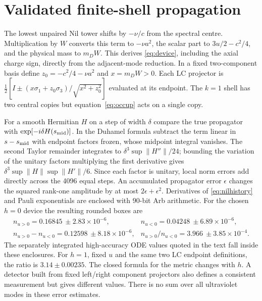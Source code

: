 \section{Validated finite-shell propagation}\label{app:device}
The lowest unpaired Nil tower shifts by \(-\nu/c\) from the spectral centre. Multiplication by \(W\) converts this term to \(-\nu a^2\), the scalar part to \(3u/2-c^2/4\), and the physical mass to \(m_DW\). This derives \eqref{eq:device}, including the axial charge sign, directly from the adjacent-mode reduction. In a fixed two-component basis define \(z_0=-c^2/4-\nu a^2\) and \(x=m_D W>0\). Each LC projector is \(\tfrac12[I\pm(x\sigma_1+z_0\sigma_3)/\sqrt{x^2+z_0^2}]\) evaluated at its endpoint. The \(k=1\) shell has two central copies but equation~\eqref{eq:occup} acts on a single copy.

For a smooth Hermitian \(H\) on a step of width \(\delta\) compare the true propagator with \(\exp[-i\delta H(s_{\rm mid})]\). In the Duhamel formula subtract the term linear in \(s-s_{\rm mid}\) with endpoint factors frozen, whose midpoint integral vanishes. The second Taylor remainder integrates to \(\delta^3\sup\|H''\|/24\); bounding the variation of the unitary factors multiplying the first derivative gives \(\delta^3\sup\|H\|\sup\|H'\|/6\). Since each factor is unitary, local norm errors add directly across the 4096 equal steps. An accumulated propagator error \(\epsilon\) changes the squared rank-one amplitude by at most \(2\epsilon+\epsilon^2\). Derivatives of \eqref{eq:nilhistory} and Pauli exponentials are enclosed with 90-bit Arb arithmetic. For the chosen \(h=0\) device the resulting rounded boxes are
\[
 \begin{array}{ll}
 n_{u>0}=0.16845\ \pm2.83\times10^{-6},&n_{u<0}=0.04248\ \pm6.89\times10^{-6},\\
 n_{u>0}-n_{u<0}=0.12598\ \pm8.18\times10^{-6},&
 n_{u>0}/n_{u<0}=3.966\ \pm3.85\times10^{-4}.
 \end{array}
\]
The separately integrated high-accuracy ODE values quoted in the text fall inside these enclosures. For \(h=1\), fixed \(u\) and the same two LC endpoint definitions, the ratio is \(3.14\pm0.00235\). The closed formula for the metric changes with \(h\). A detector built from fixed left/right component projectors also defines a consistent measurement but gives different values. There is no sum over all ultraviolet modes in these error estimates.
